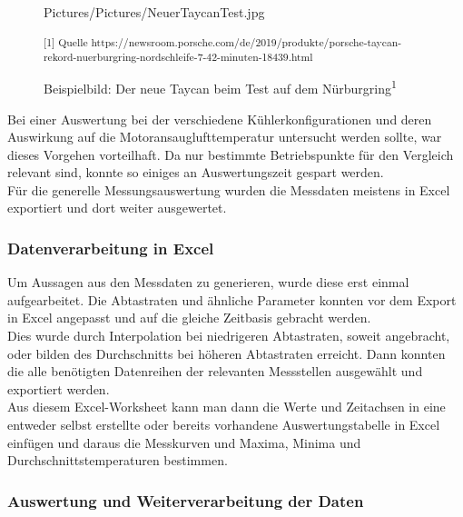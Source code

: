 \begin{figure}[h!]
	\begin{center}
		\begin{overpic}[width=\linewidth]{Pictures/Pictures/NeuerTaycanTest.jpg}
		
		\end{overpic}
		\label{TaycanTest}
		\caption{Beispielbild: Der neue Taycan beim Test auf dem Nürburgring\textsuperscript{1}}
		\small\textsuperscript{[1] Quelle https://newsroom.porsche.com/de/2019/produkte/porsche-taycan-rekord-nuerburgring-nordschleife-7-42-minuten-18439.html}
		
	\end{center}
\end{figure}

Bei einer Auswertung bei der verschiedene Kühlerkonfigurationen und deren Auswirkung auf die Motoransauglufttemperatur untersucht werden sollte, war dieses Vorgehen vorteilhaft. Da nur bestimmte Betriebspunkte für den Vergleich relevant sind, konnte so einiges an Auswertungszeit gespart werden.\\

Für die generelle Messungsauswertung wurden die Messdaten meistens in Excel exportiert und dort weiter ausgewertet.

\subsubsection{Datenverarbeitung in Excel}

Um Aussagen aus den Messdaten zu generieren, wurde diese erst einmal aufgearbeitet. Die Abtastraten und ähnliche Parameter konnten vor dem Export in Excel angepasst und auf die gleiche Zeitbasis gebracht werden. \\
Dies wurde durch Interpolation bei niedrigeren Abtastraten, soweit angebracht, oder bilden des Durchschnitts bei höheren Abtastraten erreicht. Dann konnten die alle benötigten Datenreihen der relevanten Messstellen ausgewählt und exportiert werden. \\

Aus diesem Excel-Worksheet kann man dann die Werte und Zeitachsen in eine entweder selbst erstellte oder bereits vorhandene Auswertungstabelle in Excel einfügen und daraus die Messkurven und Maxima, Minima und Durchschnittstemperaturen bestimmen.

\subsubsection{Auswertung und Weiterverarbeitung der Daten}

